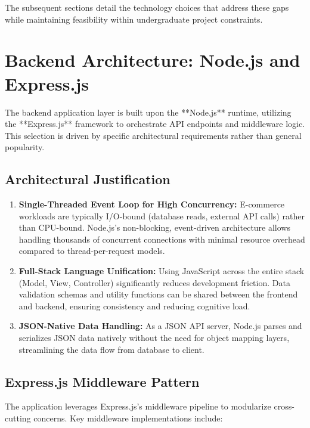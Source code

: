 \documentclass[12pt, a4paper]{report}
\begin{document}
The subsequent sections detail the technology choices that address these gaps while maintaining feasibility within undergraduate project constraints.

\section{Backend Architecture: Node.js and Express.js}

The backend application layer is built upon the **Node.js** runtime, utilizing the **Express.js** framework to orchestrate API endpoints and middleware logic. This selection is driven by specific architectural requirements rather than general popularity.

\subsection{Architectural Justification}

\begin{enumerate}
    \item \textbf{Single-Threaded Event Loop for High Concurrency:} 
    E-commerce workloads are typically I/O-bound (database reads, external API calls) rather than CPU-bound. Node.js's non-blocking, event-driven architecture allows handling thousands of concurrent connections with minimal resource overhead compared to thread-per-request models.
    
    \item \textbf{Full-Stack Language Unification:} 
    Using JavaScript across the entire stack (Model, View, Controller) significantly reduces development friction. Data validation schemas and utility functions can be shared between the frontend and backend, ensuring consistency and reducing cognitive load.
    
    \item \textbf{JSON-Native Data Handling:} 
    As a JSON API server, Node.js parses and serializes JSON data natively without the need for object mapping layers, streamlining the data flow from database to client.
\end{enumerate}

\subsection{Express.js Middleware Pattern}

The application leverages Express.js's middleware pipeline to modularize cross-cutting concerns. Key middleware implementations include:
\end{document}
